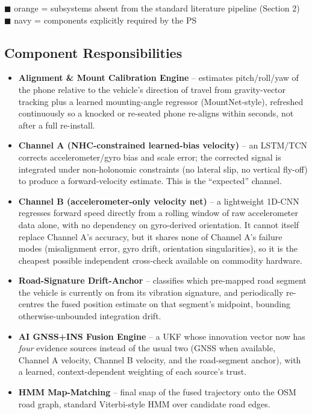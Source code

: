 \documentclass[10.5pt]{article}
\begin{document}
\begin{center}
{\scriptsize \textcolor{accent2}{$\blacksquare$} orange = subsystems absent from the standard literature pipeline (Section 2) \quad
\textcolor{isroblue}{$\blacksquare$} navy = components explicitly required by the PS}
\end{center}

\subsection{Component Responsibilities}
\begin{itemize}
\item \textbf{Alignment \& Mount Calibration Engine} -- estimates pitch/roll/yaw of the phone relative to the vehicle's direction of travel from gravity-vector tracking plus a learned mounting-angle regressor (MountNet-style), refreshed continuously so a knocked or re-seated phone re-aligns within seconds, not after a full re-install.
\item \textbf{Channel A (NHC-constrained learned-bias velocity)} -- an LSTM/TCN corrects accelerometer/gyro bias and scale error; the corrected signal is integrated under non-holonomic constraints (no lateral slip, no vertical fly-off) to produce a forward-velocity estimate. This is the ``expected'' channel.
\item \textbf{Channel B (accelerometer-only velocity net)} -- a lightweight 1D-CNN regresses forward speed directly from a rolling window of raw accelerometer data alone, with no dependency on gyro-derived orientation. It cannot itself replace Channel A's accuracy, but it shares none of Channel A's failure modes (misalignment error, gyro drift, orientation singularities), so it is the cheapest possible independent cross-check available on commodity hardware.
\item \textbf{Road-Signature Drift-Anchor} -- classifies which pre-mapped road segment the vehicle is currently on from its vibration signature, and periodically re-centres the fused position estimate on that segment's midpoint, bounding otherwise-unbounded integration drift.
\item \textbf{AI GNSS+INS Fusion Engine} -- a UKF whose innovation vector now has \emph{four} evidence sources instead of the usual two (GNSS when available, Channel A velocity, Channel B velocity, and the road-segment anchor), with a learned, context-dependent weighting of each source's trust.
\item \textbf{HMM Map-Matching} -- final snap of the fused trajectory onto the OSM road graph, standard Viterbi-style HMM over candidate road edges.
\end{itemize}
\end{document}
